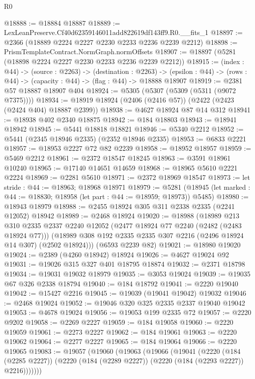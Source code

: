 \begin{lexlean}{R0}
\begin{coremodule}
@18888 := @18884 @18887
@18889 := LexLeanPreserve.Cf40d62359146011add822619df143ff9.R0.__fits_1
@18897 := @2366 (@18889 @2224 @2227 @2230 @2233 @2236 @2239 @2212)
@18898 := PrismTemplateContract.NormGraph.normOffsets
@18907 := @18897 (@5281 (@18898 @2224 @2227 @2230 @2233 @2236 @2239 @2212))
@18915 := (index : @44) ->
  (source : @2263) ->
  (destination : @2263) ->
  (epsilon : @44) -> (rows : @44) -> (capacity : @44) -> (flag : @44) -> @18888 @18907
@18919 := @2381 @57 @18887 @18907 @404
@18924 := @5305 (@5307 (@5309 (@5311 (@9072 @7375))))
@18934 := @18919 @18924 (@2406 (@2416 @57)) (@2422 (@2423 (@2424 @404) @18887 @2399))
@18938 := @4627 @18924 @87 @14 @312
@18941 := @18938 @402 @2340 @18875
@18942 := @184 @18803
@18943 := @18941 @18942
@18945 := @5441 @18818 @18821
@18946 := @5340 @2212
@18952 := @5441 (@2345 @18946 @2335) (@2352 @18946 @2335)
@18953 := @6833 @2221
@18957 := @18953 @2227 @72 @82 @2239
@18958 := @18952 @18957
@18959 := @5469 @2212
@18961 := @2372 @18547 @18245
@18963 := @3591 @18961 @10240
@18965 := @17140 @14651 @14659
@18968 := @18965 @5610 @2221 @2224
@18969 := @2281 @5610
@18971 := @2372 @18969 @18547
@18973 := let stride : @44 := @18963; @18968 @18971
@18979 := @5281
    (@18945 (let marked : @44 := @18830; @18958 (let part : @44 := @18959; @18973)) @5485)
@18980 := @18943 @18979
@18988 := @2455 @18924 @305 @311 @2338 @2335 (@2241 @12052) @18942
@18989 := @2468 @18924
@19020 := @18988
    (@18989
      @213
      @310
      @2335
      @2337
      @2240
      @12052
      (@2477 @18924 @77 @2240 (@2482 (@2483 @18924 @77)))
      (@18989 @308 @192 @2335 @2335 @307 @2216 (@2496 @18924 @14 @307) (@2502 @18924)))
    (@6593 @2239 @82)
@19021 := @18980 @19020
@19024 := @2389 (@4260 @18942) @18924
@19026 := @4627 @19024 @92
@19031 := @19026 @315 @327 @401 @18795 @18874
@19032 := @2371 @18798
@19034 := @19031 @19032 @18979
@19035 := @3053 @19024
@19039 := @19035 @67 @326 @2338 @18794
@19040 := @184 @18792
@19041 := @2220 @19040
@19042 := @15427 @2216
@19045 := @19039 (@19041 @19042) @19032
@19046 := @2468 @19024
@19052 := @19046 @320 @325 @2335 @2337 @19040 @19042
@19053 := @4678 @19024
@19056 := @19053 @199 @2335 @72
@19057 := @2220 @9202
@19058 := @2269 @2227
@19059 := @184 @19058
@19060 := @2220 @19059
@19061 := @2273 @2227
@19062 := @184 @19061
@19063 := @2220 @19062
@19064 := @2277 @2227
@19065 := @184 @19064
@19066 := @2220 @19065
@19083 := @19057
    (@19060
      (@19063
        (@19066
          (@19041
            (@2220
              (@184 (@2285 @2227))
              (@2220 (@184 (@2289 @2227)) (@2220 (@184 (@2293 @2227)) @2216)))))))

\end{coremodule}
\end{lexlean}
